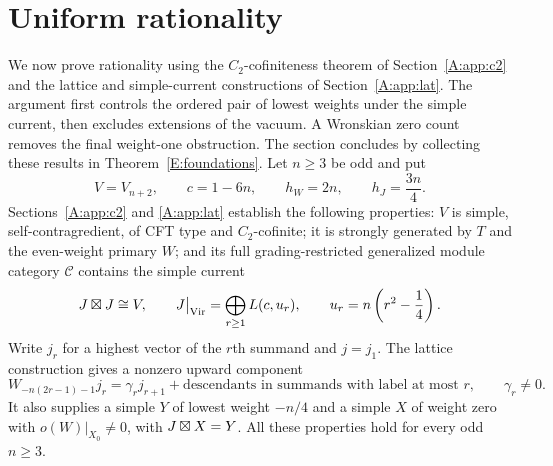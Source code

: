 \documentclass[11pt]{article}
\newcommand{\Vir}{\operatorname{Vir}}\newcommand{\Rep}{\operatorname{Rep}}
\numberwithin{equation}{section}
\begin{document}
\section{Uniform rationality}\label{A:app:rat}
We now prove rationality using the $C_2$-cofiniteness theorem of Section~\ref{A:app:c2} and the lattice and simple-current constructions of Section~\ref{A:app:lat}. The argument first controls the ordered pair of lowest weights under the simple current, then excludes extensions of the vacuum. A Wronskian zero count removes the final weight-one obstruction. The section concludes by collecting these results in Theorem~\ref{E:foundations}. 
Let $n\geq3$ be odd and put
\[
 V=V_{n+2},\qquad c=1-6n,\qquad h_W=2n,\qquad h_J=\frac{3n}{4}.
\]
Sections~\ref{A:app:c2} and \ref{A:app:lat} establish the following properties: $V$ is simple, self-contragredient, of CFT type and $C_2$-cofinite; it is strongly generated by $T$ and the even-weight primary $W$; and its full grading-restricted generalized module category $\mathcal C$ contains the simple current
\begin{equation}\label{A:rat:Jdecomp}
 J\bo J\cong V,\qquad
 J\big|_{\Vir}=\bigoplus_{r\geq1}L(c,u_r),\qquad
 u_r=n\left(r^2-\frac14\right).
\end{equation}
Write $j_r$ for a highest vector of the $r$th summand and $j=j_1$. The lattice construction gives a nonzero upward component
\begin{equation}\label{A:rat:up}
 W_{-n(2r-1)-1}j_r=\gamma_rj_{r+1}
       +\text{descendants in summands with label at most }r,
 \qquad \gamma_r\ne0.
\end{equation}
It also supplies a simple $Y$ of lowest weight $-n/4$ and a simple $X$ of weight zero with $o(W)|_{X_0}\ne0$, with $J\boxtimes X=Y$. All these properties hold for every odd $n\geq3$.
\end{document}
